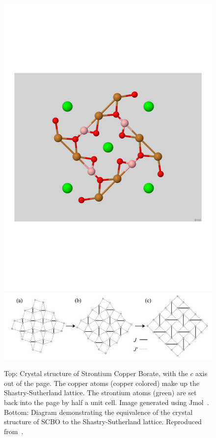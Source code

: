 \documentclass{thesis-umich}
\begin{document}
\begin{figure}
	\caption[Crystal structure of strontium copper borate]{Top: Crystal structure of Strontium Copper Borate, with the $c$ axis out of the page. The copper atoms (copper colored) make up the Shastry-Sutherland lattice. The strontium atoms (green) are set back into the page by half a unit cell. Image generated using Jmol~\cite{jmol}. Bottom: Diagram demonstrating the equivalence of the crystal structure of SCBO to the Shastry-Sutherland lattice. Reproduced from~\cite{Kageyama2005}.}
	\label{fig:scbo_crystal}
	\includegraphics[width=\columnwidth,trim={0 2.5in 0 2.5in},clip]{figures/scbo.pdf}
	\includegraphics[width=\columnwidth]{figures/scbo_to_ss_kageyama.pdf}
\end{figure}
\end{document}
